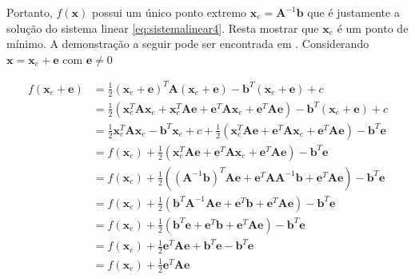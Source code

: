 Portanto, $f(\mathbf{x})$ possui um único ponto extremo $\mathbf{x}_e = \mathbf{A}^{-1}\mathbf{b}$ que é justamente a solução do sistema linear \eqref{eq:sistemalinear4}. Resta mostrar que $\mathbf{x}_e$ é um ponto de mínimo. A demonstração a seguir pode ser encontrada em \citet{Shewchuk94anintroduction}. Considerando $\mathbf{x} = \mathbf{x}_e + \mathbf{e}$ com $\mathbf{e} \neq 0 $


\begin{align}
     f(\mathbf{x}_e + \mathbf{e}) & =  \frac{1}{2} (\mathbf{x}_e + \mathbf{e})^T \mathbf{A} (\mathbf{x}_e + \mathbf{e}) - \mathbf{b}^T(\mathbf{x}_e + \mathbf{e}) + c  \nonumber\\
                & =  \frac{1}{2} (\mathbf{x}_e^T\mathbf{A}\mathbf{x}_e + \mathbf{x}_e^T\mathbf{A}\mathbf{e} + \mathbf{e}^T\mathbf{A}\mathbf{x}_e + \mathbf{e}^T\mathbf{A}\mathbf{e} )- \mathbf{b}^T(\mathbf{x}_e + \mathbf{e}) + c  \nonumber\\
                & =  \frac{1}{2} \mathbf{x}_e^T\mathbf{A}\mathbf{x}_e -\mathbf{b}^T\mathbf{x}_e + c + \frac{1}{2} ( \mathbf{x}_e^T\mathbf{A}\mathbf{e} + \mathbf{e}^T\mathbf{A}\mathbf{x}_e + \mathbf{e}^T\mathbf{A}\mathbf{e} ) - \mathbf{b}^T\mathbf{e}  \nonumber\\
                & =  f(\mathbf{x}_e) + \frac{1}{2} ( \mathbf{x}_e^T\mathbf{A}\mathbf{e} + \mathbf{e}^T\mathbf{A}\mathbf{x}_e + \mathbf{e}^T\mathbf{A}\mathbf{e} ) - \mathbf{b}^T\mathbf{e}  \nonumber\\
                & =  f(\mathbf{x}_e) + \frac{1}{2} ( (\mathbf{A}^{-1}\mathbf{b})^T\mathbf{A}\mathbf{e} + \mathbf{e}^T\mathbf{A}\mathbf{A}^{-1}\mathbf{b} + \mathbf{e}^T\mathbf{A}\mathbf{e} ) - \mathbf{b}^T\mathbf{e}  \nonumber\\
                & =  f(\mathbf{x}_e) + \frac{1}{2} ( \mathbf{b}^T\mathbf{A}^{-1}\mathbf{A}\mathbf{e} + \mathbf{e}^T\mathbf{b} + \mathbf{e}^T\mathbf{A}\mathbf{e} ) - \mathbf{b}^T\mathbf{e}  \nonumber\\
                & =  f(\mathbf{x}_e) + \frac{1}{2} ( \mathbf{b}^T\mathbf{e} + \mathbf{e}^T\mathbf{b} + \mathbf{e}^T\mathbf{A}\mathbf{e} ) - \mathbf{b}^T\mathbf{e}  \nonumber\\
                & =  f(\mathbf{x}_e) + \frac{1}{2}  \mathbf{e}^T\mathbf{A}\mathbf{e}  + \mathbf{b}^T\mathbf{e} - \mathbf{b}^T\mathbf{e}  \nonumber\\
                & =  f(\mathbf{x}_e) + \frac{1}{2}  \mathbf{e}^T\mathbf{A}\mathbf{e} \nonumber
\end{align}


